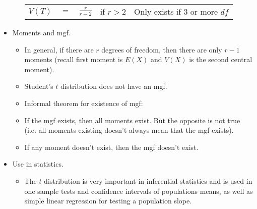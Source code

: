 \documentclass{article}
\begin{document}
\begin{itemize}
\begin{itemize}
\begin{center}
\begin{tabular}{c c c c c}
            $V(T)$ & $=$ & $\displaystyle \frac{r}{r - 2}$ & \hspace{10pt} if $r > 2$ & \hspace{10pt} Only exists if 3 or more $df$
        \end{tabular}
        \end{center}
    \end{itemize}\bigskip
    \item Moments and mgf.
    \begin{itemize}
        \item In general, if there are $r$ degrees of freedom, then there are only $r - 1$ moments (recall first moment is $E(X)$ and $V(X)$ is the second central moment).
        \item Student's $t$ distribution does not have an mgf.
        \item Informal theorem for existence of mgf:
        \item[] If the mgf exists, then all moments exist. But the opposite is not true\\ (i.e. all moments existing doesn't always mean that the mgf exists).\vspace{20pt}
	\item[] If any moment doesn't exist, then the mgf doesn't exist.
    \end{itemize}
    \item Use in statistics.
    \begin{itemize}
        \item The $t$-distribution is very important in inferential statistics and is used in one sample tests and confidence intervals of populations means, as well as simple linear regression for testing a population slope.
    \end{itemize}
\end{itemize}\bigskip
\end{document}
